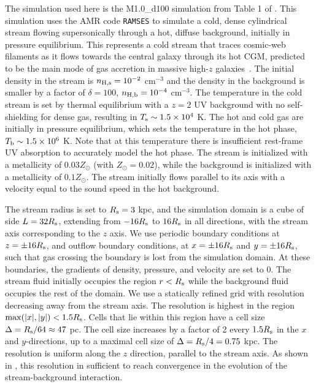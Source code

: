 \documentclass[fleqn,usenatbib]{mnras}
\begin{document}
The simulation used here is the M1.0\_d100 simulation from Table 1 of \cite{Mandelker2020a}.
This simulation uses the AMR code \texttt{RAMSES} \citep{Teyssier2002} to simulate a cold, dense cylindrical stream flowing supersonically through a hot, diffuse background, initially in pressure equilibrium.
This represents a cold stream that traces cosmic-web filaments as it flows towards the central galaxy through its hot CGM, predicted to be the main mode of gas accretion in massive high-$z$ galaxies~\citep{Keres2009a, Dekel2009}.
The initial density in the stream is $n_{\rm H,s}=10^{-2}$ cm$^{-3}$ and the density in the background is smaller by a factor of $\delta=100$, $n_{\rm H,b}=10^{-4}$ cm$^{-3}$.
The temperature in the cold stream is set by thermal equilibrium with a $z=2$ \cite{Haardt1996} UV background with no self-shielding for dense gas, resulting in $T_{\rm s}\sim 1.5 \times 10^4$ K.
The hot and cold gas are initially in pressure equilibrium, which sets the temperature in the hot phase, $T_{\rm b}\sim 1.5 \times 10^6$ K.
Note that at this temperature there is insufficient rest-frame UV absorption to accurately model the hot phase.
The stream is initialized with a metallicity of $0.03 Z_\odot$ (with $Z_\odot = 0.02$), while the background is initialized with a metallicity of $0.1 Z_\odot$.
The stream initially flows parallel to its axis with a velocity equal to the sound speed in the hot background.

The stream radius is set to $R_{\rm s}=3$ kpc, and the simulation domain is a cube of side $L=32R_{\rm s}$, extending from $-16R_{\rm s}$ to $16R_{\rm s}$ in all directions, with the stream axis corresponding to the $z$ axis.
We use periodic boundary conditions at $z=\pm 16R_{\rm s}$, and outflow boundary conditions, at $x=\pm 16R_{\rm s}$ and $y=\pm 16R_{\rm s}$, such that gas crossing the boundary is lost from the simulation domain.
At these boundaries, the gradients of density, pressure, and velocity are set to 0.
The stream fluid initially occupies the region $r<R_{\rm s}$ while the background fluid occupies the rest of the domain.
We use a statically refined grid with resolution decreasing away from the stream axis.
The resolution is highest in the region ${\rm max}(|x|,|y|)<1.5R_{\rm s}$.
Cells that lie within this region have a cell size $\Delta=R_{\rm s}/64\approx 47$ pc.
The cell size increases by a factor of 2 every $1.5R_{\rm s}$ in the $x$ and $y$-directions, up to a maximal cell size of $\Delta=R_{\rm s}/4=0.75$ kpc.
The resolution is uniform along the $z$ direction, parallel to the stream axis.
As shown in \cite{Mandelker2020a}, this resolution in sufficient to reach convergence in the evolution of the stream-background interaction.
\end{document}
